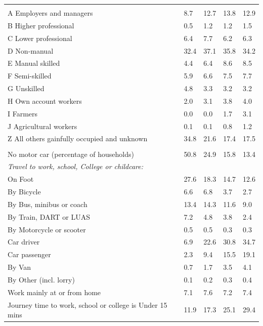 \documentclass{article}
\begin{document}
\begin{table}[h]
\begin{tabular}{KTTTT}
\hline
    \\ 
    \hline
A Employers and managers &  8.7& 12.7& 13.8& 12.9\\
B Higher professional & 0.5& 1.2& 1.2& 1.5\\
C Lower professional & 6.4& 7.7& 6.2& 6.3\\
D Non-manual & 32.4& 37.1& 35.8& 34.2\\
E Manual skilled & 4.4& 6.4& 8.6& 8.5\\
F Semi-skilled & 5.9& 6.6& 7.5& 7.7\\
G Unskilled & 4.8& 3.3& 3.2& 3.2\\
H Own account workers & 2.0& 3.1& 3.8& 4.0\\
I Farmers & 0.0& 0.0& 1.7& 3.1\\
J Agricultural workers & 0.1& 0.1& 0.8& 1.2\\
Z All others gainfully occupied and unknown & 34.8& 21.6& 17.4& 17.5\\
\hline
{}\hline
    \\ 
    \hline
No motor car (percentage of households) & 50.8& 24.9& 15.8& 
13.4\\
    \hline 
\emph{Travel to work, school, College or childcare:} & & & \\
\quad On Foot & 27.6& 18.3& 14.7& 12.6\\ 
\quad By Bicycle & 6.6& 6.8& 3.7& 2.7\\ 
\quad By Bus, minibus or coach & 13.4& 14.3& 11.6&  9.0\\
\quad By Train, DART or LUAS & 7.2& 4.8& 3.8& 2.4\\
\quad By Motorcycle or scooter & 0.5& 0.5& 0.3& 0.3\\
\quad Car driver &  6.9 & 22.6& 30.8& 34.7\\
\quad Car passenger &  2.3&  9.4& 15.5& 19.1\\
\quad By Van & 0.7& 1.7& 3.5& 4.1\\
\quad By Other (incl. lorry) & 0.1& 0.2& 0.3& 0.4\\
    \hline
Work mainly at or from home & 7.1& 7.6& 7.2& 7.4\\
Journey time to work, school or college is Under 15 mins & 11.9& 17.3& 25.1& 29.4\\

\end{tabular}
\end{table}
\end{document}
